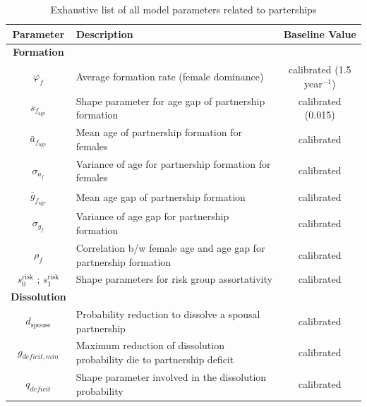 \documentclass[11pt, onecolumn]{article}
\begin{document}
\begin{table}[htdp]

\begin{footnotesize}
\begin{center}
\begin{tabular}{|clc|}
\hline
\textbf{Parameter}  & \textbf{Description} & \textbf{Baseline Value}\\
\hline

\textbf{Formation} & & \\
 $\varphi_f$ & Average formation rate (female dominance) & calibrated (1.5 year$^{-1}$)\\
$s_{f_\mathrm{age}}$  & Shape parameter for age gap of partnership formation & calibrated (0.015)\\
$\bar{a}_{f_\mathrm{age}}$  & Mean age of partnership formation for females & calibrated \\
$\sigma_{a_f}$  & Variance of age for partnership formation for females & calibrated \\
$\bar{g}_{f_\mathrm{age}}$  & Mean age gap of partnership formation & calibrated \\
$\sigma_{g_f}$  & Variance of age gap for partnership formation & calibrated  \\
$\rho_f$  & Correlation b/w female age and age gap for partnership formation & calibrated  \\
$s^{\mathrm{risk}}_0$ ; $s^{\mathrm{risk}}_1$  & Shape parameters for risk group assortativity & calibrated  \\
\textbf{Dissolution} & & \\
$d_{\mathrm{spouse}}$&Probability reduction to dissolve a spousal partnership & calibrated\\
$g_{deficit,min}$ & Maximum reduction of dissolution probability die to partnership deficit& calibrated\\
 $q_{deficit}$ & Shape parameter involved in the dissolution probability & calibrated \\


\hline
\end{tabular}
\caption{Exhaustive list of all model parameters related to parterships}
\label{tab:partnerAllParam}
\end{center}
\end{footnotesize}
\end{table}


\end{document}
